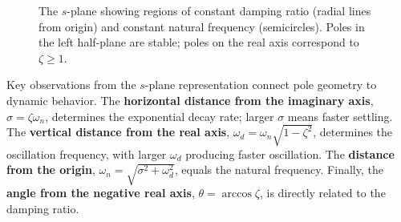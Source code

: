 \begin{figure}[H]
\caption{The $s$-plane showing regions of constant damping ratio (radial lines from origin) and constant natural frequency (semicircles). Poles in the left half-plane are stable; poles on the real axis correspond to $\zeta \geq 1$.}
\label{fig:s_plane}
\end{figure}

Key observations from the $s$-plane representation connect pole geometry to dynamic behavior. The \textbf{horizontal distance from the imaginary axis}, $\sigma = \zeta\omega_n$, determines the exponential decay rate; larger $\sigma$ means faster settling. The \textbf{vertical distance from the real axis}, $\omega_d = \omega_n\sqrt{1-\zeta^2}$, determines the oscillation frequency, with larger $\omega_d$ producing faster oscillation. The \textbf{distance from the origin}, $\omega_n = \sqrt{\sigma^2 + \omega_d^2}$, equals the natural frequency. Finally, the \textbf{angle from the negative real axis}, $\theta = \arccos\zeta$, is directly related to the damping ratio.

